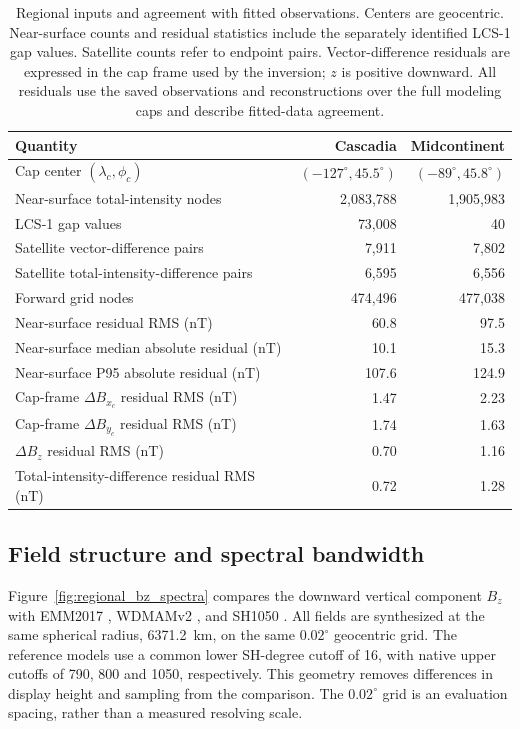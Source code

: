 ﻿\documentclass[11pt,a4paper]{article}
\begin{document}
\begin{table}[!htbp]
\centering
\small
\caption{Regional inputs and agreement with fitted observations. Centers are geocentric. Near-surface counts and residual statistics include the separately identified LCS-1 gap values. Satellite counts refer to endpoint pairs. Vector-difference residuals are expressed in the cap frame used by the inversion; $z$ is positive downward. All residuals use the saved observations and reconstructions over the full modeling caps and describe fitted-data agreement.}
\label{tab:regional_application}
\begin{tabular}{@{}lrr@{}}
\toprule
Quantity & Cascadia & Midcontinent\\
\midrule
Cap center $(\lambda_c,\phi_c)$ & $(-127^\circ,45.5^\circ)$ & $(-89^\circ,45.8^\circ)$\\
Near-surface total-intensity nodes & 2,083,788 & 1,905,983\\
\quad LCS-1 gap values & 73,008 & 40\\
Satellite vector-difference pairs & 7,911 & 7,802\\
Satellite total-intensity-difference pairs & 6,595 & 6,556\\
Forward grid nodes & 474,496 & 477,038\\
Near-surface residual RMS (nT) & 60.8 & 97.5\\
Near-surface median absolute residual (nT) & 10.1 & 15.3\\
Near-surface P95 absolute residual (nT) & 107.6 & 124.9\\
Cap-frame $\Delta B_{x_c}$ residual RMS (nT) & 1.47 & 2.23\\
Cap-frame $\Delta B_{y_c}$ residual RMS (nT) & 1.74 & 1.63\\
$\Delta B_z$ residual RMS (nT) & 0.70 & 1.16\\
Total-intensity-difference residual RMS (nT) & 0.72 & 1.28\\
\bottomrule
\end{tabular}
\end{table}

\subsection{Field structure and spectral bandwidth}

Figure~\ref{fig:regional_bz_spectra} compares the downward vertical component $B_z$ with EMM2017 \citep{NOAAEMM2017}, WDMAMv2 \citep{LesurEtAl2016}, and SH1050 \citep{ThebaultEtAl2021,ThebaultEtAl2021Data}. All fields are synthesized at the same spherical radius, 6371.2~km, on the same $0.02^\circ$ geocentric grid. The reference models use a common lower SH-degree cutoff of 16, with native upper cutoffs of 790, 800 and 1050, respectively. This geometry removes differences in display height and sampling from the comparison. The $0.02^\circ$ grid is an evaluation spacing, rather than a measured resolving scale.
\end{document}
